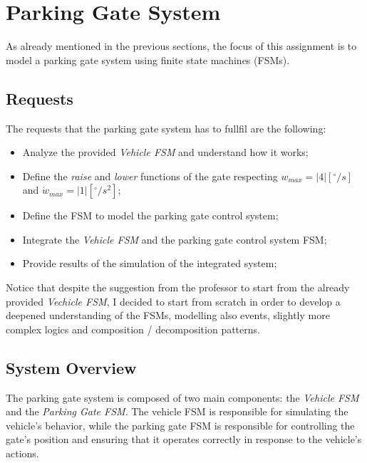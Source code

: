 \section{Parking Gate System}
\label{sec:parking_gate_system}

As already mentioned in the previous sections, the focus of this assignment is to model a parking gate system using finite state machines (FSMs).

\subsection{Requests}
\label{subsec:requests}

The requests that the parking gate system has to fullfil are the following:

\begin{itemize}
    \item Analyze the provided \textit{Vehicle FSM} and understand how it works;
    \item Define the \textit{raise} and \textit{lower} functions of the gate respecting $w_{max} = |4| [^\circ / s]$ and $\dot{w}_{max} = |1| [^\circ / s^2]$;
    \item Define the FSM to model the parking gate control system;
    \item Integrate the \textit{Vehicle FSM} and the parking gate control system FSM;
    \item Provide results of the simulation of the integrated system;
\end{itemize}

Notice that despite the suggestion from the professor to start from the already provided \textit{Vechicle FSM}, I decided to start from scratch in order to develop a deepened understanding of the FSMs, modelling also events, slightly more complex logics and composition / decomposition patterns.



\subsection{System Overview}
\label{subsec:system_overview}

The parking gate system is composed of two main components: the \textit{Vehicle FSM} and the \textit{Parking Gate FSM}.
The vehicle FSM is responsible for simulating the vehicle's behavior, while the parking gate FSM is responsible for controlling the gate's position and ensuring that it operates correctly in response to the vehicle's actions.

